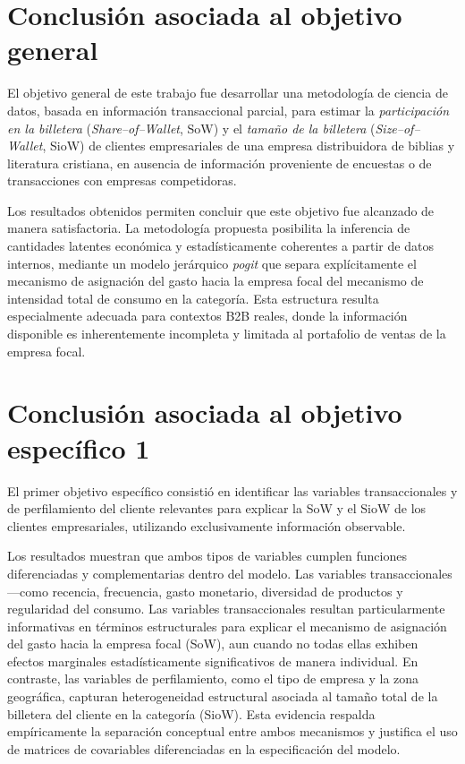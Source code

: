 

\section{Conclusión asociada al objetivo general}

El objetivo general de este trabajo fue desarrollar una metodología de ciencia de datos, basada en información transaccional parcial, para estimar la \emph{participación en la billetera} (\emph{Share--of--Wallet}, SoW) y el \emph{tamaño de la billetera} (\emph{Size--of--Wallet}, SioW) de clientes empresariales de una empresa distribuidora de biblias y literatura cristiana, en ausencia de información proveniente de encuestas o de transacciones con empresas competidoras.

Los resultados obtenidos permiten concluir que este objetivo fue alcanzado de manera satisfactoria. La metodología propuesta posibilita la inferencia de cantidades latentes económica y estadísticamente coherentes a partir de datos internos, mediante un modelo jerárquico \emph{pogit} que separa explícitamente el mecanismo de asignación del gasto hacia la empresa focal del mecanismo de intensidad total de consumo en la categoría. Esta estructura resulta especialmente adecuada para contextos B2B reales, donde la información disponible es inherentemente incompleta y limitada al portafolio de ventas de la empresa focal.

\section{Conclusión asociada al objetivo específico 1}

El primer objetivo específico consistió en identificar las variables transaccionales y de perfilamiento del cliente relevantes para explicar la SoW y el SioW de los clientes empresariales, utilizando exclusivamente información observable.

Los resultados muestran que ambos tipos de variables cumplen funciones diferenciadas y complementarias dentro del modelo. Las variables transaccionales —como recencia, frecuencia, gasto monetario, diversidad de productos y regularidad del consumo. Las variables transaccionales resultan particularmente informativas en términos estructurales para explicar el mecanismo de asignación del gasto hacia la empresa focal (SoW), aun cuando no todas ellas exhiben efectos marginales estadísticamente significativos de manera individual. En contraste, las variables de perfilamiento, como el tipo de empresa y la zona geográfica, capturan heterogeneidad estructural asociada al tamaño total de la billetera del cliente en la categoría (SioW). Esta evidencia respalda empíricamente la separación conceptual entre ambos mecanismos y justifica el uso de matrices de covariables diferenciadas en la especificación del modelo.

